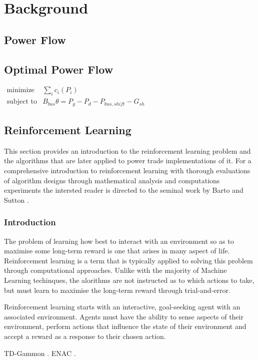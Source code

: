 \chapter{Background}

\section{Power Flow}

\section{Optimal Power Flow}

$
  \begin{array}{ll}
  \mbox{minimize}   & \sum_i c_i (P_i) \\
  \mbox{subject to} & B_{bus} \theta = P_g - P_d - P_{bus,shift} - G_{sh}
  \end{array}
$

\section{Reinforcement Learning}
This section provides an introduction to the reinforcement learning problem and
the algorithms that are later applied to power trade implementations of it.
For a comprehensive introduction to reinforcement learning with
thorough evaluations of algorithm designs through mathematical analysis and
computations experiments the intersted reader is directed to the seminal work
by Barto and Sutton \cite{suttonbarto:1998}.

\subsection{Introduction}
The problem of learning how best to interact with an environment so as to
maximise some long-term reward is one that arises in many aspect of life.
Reinforcement learning is a term that is typically applied to solving this
problem through computational approaches.  Unlike with the majority of Machine
Learning techinques, the alorithms are not instructed as to which actions to
take, but must learn to maximise the long-term reward through trial-and-error.

Reinforcement learning starts with an interactive, goal-seeking agent with an
associated environment.  Agents must have the ability to sense aspects
of their environment, perform actions that influence the state of their
environment and accept a reward as a response to their chosen action.


TD-Gammon \cite{tesauro:gammon}. ENAC \cite{peters:enac}.

